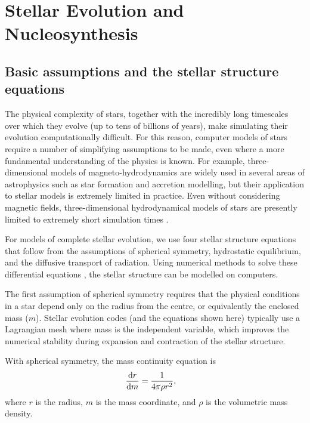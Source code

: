 \section{Stellar Evolution and Nucleosynthesis}

\subsection{Basic assumptions and the stellar structure equations}
The physical complexity of stars, together with the incredibly long timescales over which they evolve (up to tens of billions of years), make simulating their evolution computationally difficult. For this reason, computer models of stars require a number of simplifying assumptions to be made, even where a more fundamental understanding of the physics is known. For example, three-dimensional models of magneto-hydrodynamics are widely used in several areas of astrophysics such as star formation and accretion modelling, but their application to stellar models is extremely limited in practice. Even without considering magnetic fields, three-dimensional hydrodynamical models of stars are presently limited to extremely short simulation times \citep[e.g., a few hours of real-time,][]{Mocak:2011jk,Stancliffe:2011dw,Woodward:2015da}.

For models of complete stellar evolution, we use four stellar structure equations that follow from the assumptions of spherical symmetry, hydrostatic equilibrium, and the diffusive transport of radiation. Using numerical methods to solve these differential equations \citep{Henyey:1959iz,Henyey:1964ip}, the stellar structure can be modelled on computers.

The first assumption of spherical symmetry requires that the physical conditions in a star depend only on the radius from the centre, or equivalently the enclosed mass ($m$). Stellar evolution codes (and the equations shown here) typically use a Lagrangian mesh where mass is the independent variable, which improves the numerical stability during expansion and contraction of the stellar structure.

With spherical symmetry, the mass continuity equation is
\begin{align}
	\frac{\mathrm{d} r}{\mathrm{d} m} &= \frac{1}{4\pi\rho r^2},
\end{align}
where $r$ is the radius, $m$ is the mass coordinate, and $\rho$ is the volumetric mass density.

